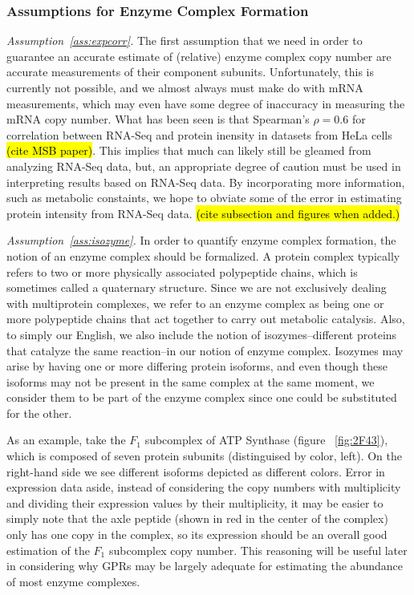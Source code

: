 \begin{methods}
\subsubsection{Assumptions for Enzyme Complex Formation}
\emph{Assumption~\ref{ass:expcorr}.}
The first assumption that we need in order to guarantee an accurate
estimate of (relative) enzyme complex copy number are accurate
measurements of their component subunits. Unfortunately, this is
currently not possible, and we almost always must make do with mRNA
measurements, which may even have some degree of inaccuracy in
measuring the mRNA copy number. What has been seen is that Spearman's
$\rho = 0.6$ for correlation between RNA-Seq and protein inensity in
datasets from HeLa cells \hl{(cite MSB paper)}. This implies that much
can likely still be gleamed from analyzing RNA-Seq data, but, an
appropriate degree of caution must be used in interpreting results
based on RNA-Seq data. By incorporating more information, such as
metabolic constaints, we hope to obviate some of the error in
estimating protein intensity from RNA-Seq data. \hl{(cite subsection
and figures when added.)}

\emph{Assumption~\ref{ass:isozyme}.}
In order to quantify enzyme complex formation, the notion of an enzyme
complex should be formalized.
A protein complex typically refers to two or more physically associated polypeptide chains, which is
sometimes called a quaternary structure. Since we
are not exclusively dealing with multiprotein complexes, we refer to an enzyme complex as being
one or more polypeptide chains that act together to carry out metabolic catalysis. Also, to simply
our English, we also include the notion of isozymes--different proteins that catalyze the 
same reaction--in our notion of enzyme complex. Isozymes may arise by having one or more differing
protein isoforms, and even though these isoforms may not be present in the same complex at the same
moment, we consider them to be part of the enzyme complex since one could be substituted for the other.

As an example, take the $F_1$ subcomplex of ATP Synthase (figure
~\ref{fig:2F43}), which is composed of seven protein subunits
(distinguised by color, left). On the right-hand side we see different
isoforms depicted as different colors.  Error in expression data
aside, instead of considering the copy numbers with multiplicity and
dividing their expression values by their multiplicity, it may be
easier to simply note that the axle peptide (shown in red in the
center of the complex) only has one copy in the complex, so its
expression should be an overall good estimation of the $F_1$ subcomplex
copy number. This reasoning will be useful later in considering why
GPRs may be largely adequate for estimating the abundance of most
enzyme complexes.


\end{methods}
